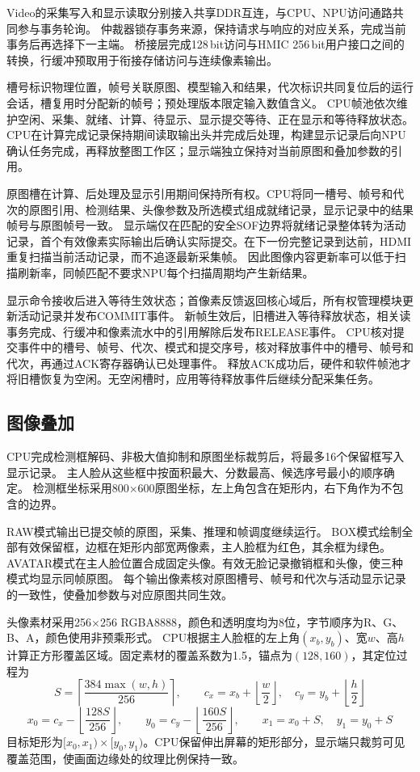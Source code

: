 Video的采集写入和显示读取分别接入共享DDR互连，与CPU、NPU访问通路共同参与事务轮询。
仲裁器锁存事务来源，保持请求与响应的对应关系，完成当前事务后再选择下一主端。
桥接层完成128\,bit访问与HMIC 256\,bit用户接口之间的转换，行缓冲预取用于衔接存储访问与连续像素输出。

槽号标识物理位置，帧号关联原图、模型输入和结果，代次标识共同复位后的运行会话，槽复用时分配新的帧号；预处理版本限定输入数值含义。
CPU帧池依次维护空闲、采集、就绪、计算、待显示、显示提交等待、正在显示和等待释放状态。
CPU在计算完成记录保持期间读取输出头并完成后处理，构建显示记录后向NPU确认任务完成，再释放整图工作区；显示端独立保持对当前原图和叠加参数的引用。

原图槽在计算、后处理及显示引用期间保持所有权。CPU将同一槽号、帧号和代次的原图引用、检测结果、头像参数及所选模式组成就绪记录，显示记录中的结果帧号与原图帧号一致。
显示端仅在匹配的安全SOF边界将就绪记录整体转为活动记录，首个有效像素实际输出后确认实际提交。在下一份完整记录到达前，HDMI重复扫描当前活动记录，而不追逐最新采集帧。
因此图像内容更新率可以低于扫描刷新率，同帧匹配不要求NPU每个扫描周期均产生新结果。

显示命令接收后进入等待生效状态；首像素反馈返回核心域后，所有权管理模块更新活动记录并发布COMMIT事件。
新帧生效后，旧槽进入等待释放状态，相关读事务完成、行缓冲和像素流水中的引用解除后发布RELEASE事件。
CPU核对提交事件中的槽号、帧号、代次、模式和提交序号，核对释放事件中的槽号、帧号和代次，再通过ACK寄存器确认已处理事件。
释放ACK成功后，硬件和软件帧池才将旧槽恢复为空闲。无空闲槽时，应用等待释放事件后继续分配采集任务。

\subsection{图像叠加}\label{sec:video-overlay}

CPU完成检测框解码、非极大值抑制和原图坐标裁剪后，将最多16个保留框写入显示记录。
主人脸从这些框中按面积最大、分数最高、候选序号最小的顺序确定。
检测框坐标采用800$\times$600原图坐标，左上角包含在矩形内，右下角作为不包含的边界。

RAW模式输出已提交帧的原图，采集、推理和帧调度继续运行。
BOX模式绘制全部有效保留框，边框在矩形内部宽两像素，主人脸框为红色，其余框为绿色。
AVATAR模式在主人脸位置合成固定头像。有效无脸记录撤销框和头像，使三种模式均显示同帧原图。
每个输出像素核对原图槽号、帧号和代次与活动显示记录的一致性，使叠加参数与对应原图共同生效。

头像素材采用256$\times$256 RGBA8888，颜色和透明度均为8位，字节顺序为R、G、B、A，颜色使用非预乘形式。
CPU根据主人脸框的左上角$(x_b,y_b)$、宽$w$、高$h$计算正方形覆盖区域。固定素材的覆盖系数为1.5，锚点为$(128,160)$，其定位过程为
\[
S=\left\lceil\frac{384\max(w,h)}{256}\right\rceil,\qquad
c_x=x_b+\left\lfloor\frac{w}{2}\right\rfloor,\quad
c_y=y_b+\left\lfloor\frac{h}{2}\right\rfloor
\]
\[
x_0=c_x-\left\lfloor\frac{128S}{256}\right\rfloor,\qquad
y_0=c_y-\left\lfloor\frac{160S}{256}\right\rfloor,\qquad
x_1=x_0+S,\quad y_1=y_0+S
\]
目标矩形为$[x_0,x_1)\times[y_0,y_1)$。CPU保留伸出屏幕的矩形部分，显示端只裁剪可见覆盖范围，使画面边缘处的纹理比例保持一致。

